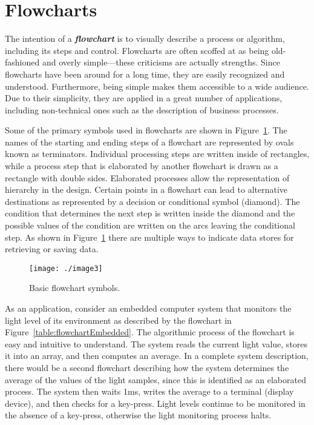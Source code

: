 \section{Flowcharts}
\label{section:flowcharts}

The intention of a \emph{\textbf{flowchart}} is to visually describe a
process or algorithm, including its steps and control. Flowcharts are
often scoffed at as being old-fashioned and overly simple---these
criticisms are actually strengths. Since flowcharts have been around for
a long time, they are easily recognized and understood. Furthermore,
being simple makes them accessible to a wide audience. Due to their
simplicity, they are applied in a great number of applications,
including non-technical ones such as the description of business
processes.

Some of the primary symbols used in flowcharts are shown in 
Figure~\ref{figure:basicFlowChartSymbols}.
The names of the starting and ending steps of a flowchart are
represented by ovals known as terminators. Individual processing steps
are written inside of rectangles, while a process step that is
elaborated by another flowchart is drawn as a rectangle with double
sides. Elaborated processes allow the representation of hierarchy in the
design. Certain points in a flowchart can lead to alternative
destinations as represented by a decision or conditional symbol
(diamond). The condition that determines the next step is written inside
the diamond and the possible values of the condition are written on the
arcs leaving the conditional step. As shown in 
Figure~\ref{figure:basicFlowChartSymbols} there are
multiple ways to indicate data stores for retrieving or saving data.

\begin{figure}
\texttt{[image: ./image3]}
\caption{Basic flowchart symbols.}
\label{figure:basicFlowChartSymbols}
\end{figure}

As an application, consider an embedded computer system that monitors
the light level of its environment as described by the flowchart in
Figure~\ref{table:flowchartEmbedded}. 
The algorithmic process of the flowchart is easy and
intuitive to understand. The system reads the current light value,
stores it into an array, and then computes an average. In a complete
system description, there would be a second flowchart describing how the
system determines the average of the values of the light samples, since
this is identified as an elaborated process. The system then waits 1ms,
writes the average to a terminal (display device), and then checks for a
key-press. Light levels continue to be monitored in the absence of a
key-press, otherwise the light monitoring process halts.


